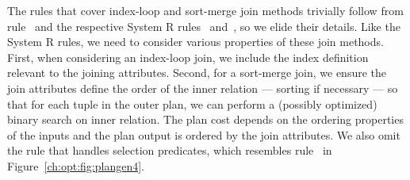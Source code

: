 %
%
%

The rules that cover index-loop and sort-merge join methods trivially follow
from rule~ and the respective System R rules~ and~, so
we elide their details.  Like the System R rules, we need to consider various
properties of these join methods.  First, when considering an index-loop join,
we include the index definition relevant to the joining attributes.  Second,
for a sort-merge join, we ensure the join attributes define the order of
the inner relation --- sorting if necessary --- so that for each tuple in the
outer plan, we can perform a (possibly optimized) binary search on inner
relation.  The plan cost depends on the ordering properties of the inputs and
the plan output is ordered by the join attributes.  We also omit the rule that
handles selection predicates, which resembles rule~ in
Figure~\ref{ch:opt:fig:plangen4}.

